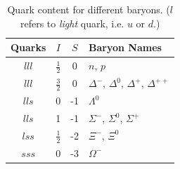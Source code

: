     \begin{table}
        \centering
        \begin{tabular}{c|cc|l}
            Quarks & $I$           & $S$ & Baryon Names\\
            \hline
            $lll$    & $\frac{1}{2}$ &  0  & $n$, $p$\\
            $lll$    & $\frac{3}{2}$ &  0  & $\Delta^-$, $\Delta^0$, $\Delta^+$, $\Delta^{++}$\\
            $lls$    & 0             & -1  & $\Lambda^0$\\
            $lls$    & 1             & -1  & $\Sigma^-$, $\Sigma^0$, $\Sigma^+$\\
            $lss$    & $\frac{1}{2}$ & -2  & $\Xi^-$, $\Xi^0$\\
            $sss$    & 0             & -3  & $\Omega^-$
        \end{tabular}
        \caption{Quark content for different baryons. ($l$ refers to \emph{light} quark, i.e. $u$ or $d$.)}
        \label{table:baryon_names}
    \end{table}
